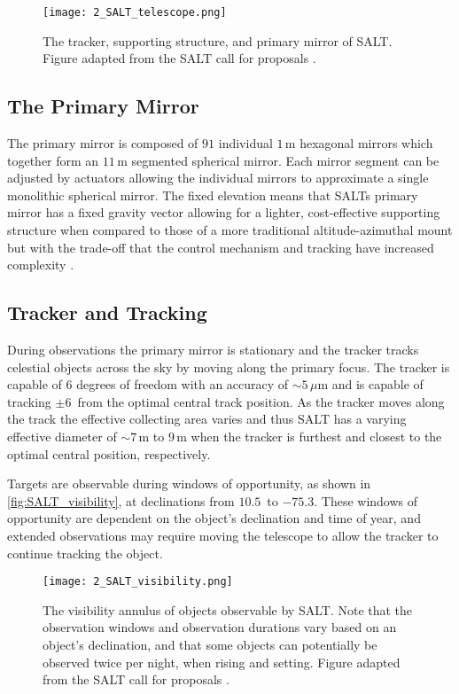 \begin{figure}[t]
    \centering
    \texttt{[image: 2\_SALT\_telescope.png]}
    \caption{
        The tracker, supporting structure, and primary mirror of \gls{SALT}.
        Figure adapted from the \gls{SALT} call for proposals \citep{SALT_CFP}.
    }
    \label{fig:SALT_telescope}
\end{figure}

\subsection{The Primary Mirror}

The primary mirror is composed of $91$ individual $1$\,m hexagonal mirrors which together form an $11$\,m segmented spherical mirror.
Each mirror segment can be adjusted by actuators allowing the individual mirrors to approximate a single monolithic spherical mirror.
The fixed elevation means that \glspl{SALT} primary mirror has a fixed gravity vector allowing for a lighter, cost-effective supporting structure when compared to those of a more traditional altitude-azimuthal mount but with the trade-off that the control mechanism and tracking have increased complexity \citep{SALT_design}.

\subsection{Tracker and Tracking}

During observations the primary mirror is stationary and the tracker tracks celestial objects across the sky by moving along the primary focus.
The tracker is capable of $6$ degrees of freedom with an accuracy of $\sim 5$\,$\mu$m and is capable of tracking $\pm 6$\degree\ from the optimal central track position.
As the tracker moves along the track the effective collecting area varies and thus \gls{SALT} has a varying effective diameter of $\sim 7$\,m to $9$\,m when the tracker is furthest and closest to the optimal central position, respectively.

Targets are observable during windows of opportunity, as shown in \autoref{fig:SALT_visibility}, at declinations from $10.5$\degree\ to $-75.3$\degree.
These windows of opportunity are dependent on the object's declination and time of year, and extended observations may require moving the telescope to allow the tracker to continue tracking the object.

\begin{figure}[t]
    \centering
    \texttt{[image: 2\_SALT\_visibility.png]}
    \caption{
        The visibility annulus of objects observable by \gls{SALT}.
        Note that the observation windows and observation durations vary based on an object's declination, and that some objects can potentially be observed twice per night, when rising and setting.
        Figure adapted from the \gls{SALT} call for proposals \citep{SALT_CFP}.
    }
    \label{fig:SALT_visibility}
\end{figure}

